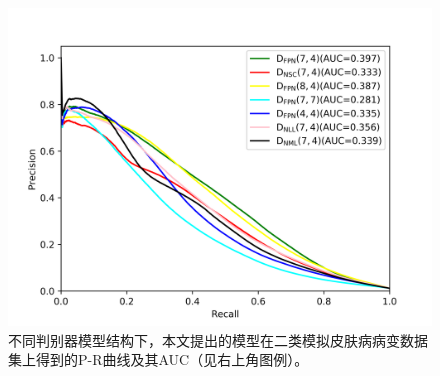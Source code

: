 \begin{figure}[h]
	\centering
	\includegraphics[width=1.0\textwidth]{figure/pr_curve_dis_arch/pr_curve.png}
	\caption{不同判别器模型结构下，本文提出的模型在二类模拟皮肤病病变数据集上得到的P-R曲线及其AUC（见右上角图例）。} 
	\label{fig:pr_curve_skin_dis_arch}
\end{figure}

